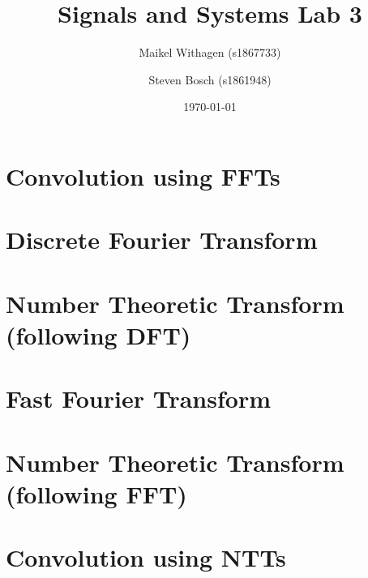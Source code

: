 \documentclass{article}
\title{Signals and Systems Lab 3}
\author{Maikel Withagen (s1867733) \and Steven Bosch (s1861948)}
\date{\today}
\begin{document}
\maketitle

\section{Convolution using FFTs}

 
 
\section{Discrete Fourier Transform}
 
 
 
 
\section{Number Theoretic Transform (following DFT)}
 
 
 
\section{Fast Fourier Transform}
 
 
 

\section{Number Theoretic Transform (following FFT)}

\section{Convolution using NTTs}
 
\end{document}
